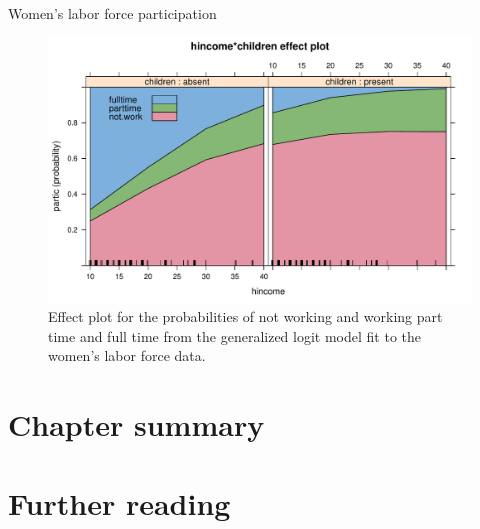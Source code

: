 \documentclass[11pt]{book}\usepackage[]{graphicx}\usepackage[]{color}
\newenvironment{knitrout}{}{} %
\renewenvironment{knitrout}{\small\renewcommand{\baselinestretch}{.85}}{} %
\begin{document}
\begin{Example}[wlfpart2]{Women's labor force participation}
\begin{knitrout}
\begin{figure}[!htbp]
\centerline{\includegraphics[width=.8\textwidth]{ch07/fig/wlf-multi-effect-1} }

\caption[Effect plot for the probabilities of not working and working part time and full time from the generalized logit model fit to the women's labor force data]{Effect plot for the probabilities of not working and working part time and full time from the generalized logit model fit to the women's labor force data.\label{fig:wlf-multi-effect}}
\end{figure}


\end{knitrout}

\end{Example}



\section{Chapter summary}\label{sec:ch07-summary}



\section{Further reading}\label{sec:ch07-reading}
\end{document}
